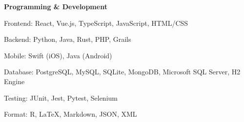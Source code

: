 \textbf{Programming \& Development}
\begin{subitems}
    \item Frontend: React, Vue.js, TypeScript, JavaScript, HTML/CSS
    \item Backend: Python, Java, Rust, PHP, Grails
    \item Mobile: Swift (iOS), Java (Android)
    \item Database: PostgreSQL, MySQL, SQLite, MongoDB, Microsoft SQL Server, H2 Engine
    \item Testing: JUnit, Jest, Pytest, Selenium
    \item Format: R, LaTeX, Markdown, JSON, XML
\end{subitems}

